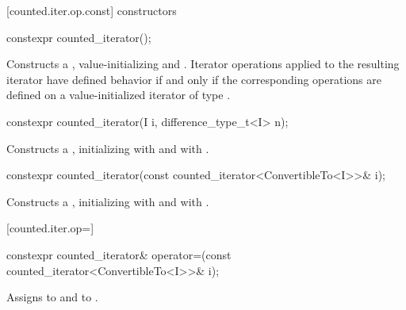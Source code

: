 [counted.iter.op.const]{ constructors}

%
\begin{itemdecl}
constexpr counted_iterator();
\end{itemdecl}

\begin{itemdescr}
\pnum
\effects Constructs a , value-initializing
 and . Iterator operations applied to the
resulting iterator have defined behavior if and only if the corresponding operations
are defined on a value-initialized iterator of type .
\end{itemdescr}

%
\begin{itemdecl}
constexpr counted_iterator(I i, difference_type_t<I> n);
\end{itemdecl}

\begin{itemdescr}
\pnum
\requires {}

\pnum
\effects Constructs a , initializing
 with  and  with .
\end{itemdescr}

%
\begin{itemdecl}
constexpr counted_iterator(const counted_iterator<ConvertibleTo<I>>& i);
\end{itemdecl}

\begin{itemdescr}
\pnum
\effects Constructs a , initializing
 with  and  with .
\end{itemdescr}

[counted.iter.op=]{}

%
%
\begin{itemdecl}
constexpr counted_iterator& operator=(const counted_iterator<ConvertibleTo<I>>& i);
\end{itemdecl}

\begin{itemdescr}
\pnum
\effects Assigns  to
 and  to .

\end{itemdescr}

